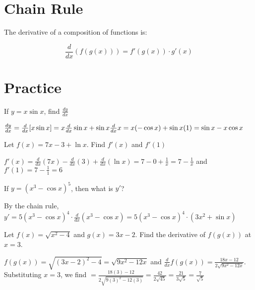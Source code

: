 \section{Chain Rule}

The derivative of a composition of functions is:

\begin{equation}
\frac{d}{dx}(f(g(x))) = f'(g(x)) \cdot g'(x)
\end{equation}

\section{Practice}
\begin{Exercise}[label=deriv_rules1]
    If $y=x\sin{x}$, find $\frac{dy}{dx}$
\end{Exercise}
\begin{Answer}[ref=deriv_rules1]
    $\frac{dy}{dx}=\frac{d}{dx}[x\sin{x}] = x\frac{d}{dx}\sin{x}+\sin{x}\frac{d}{dx}x = x(-\cos{x})+\sin{x}(1) \\
    = \sin{x}-x\cos{x}$
\end{Answer}

\begin{Exercise}[label=deriv_rules2]
    Let $f(x)=7x-3+\ln{x}$. Find $f'(x)$ and $f'(1)$
\end{Exercise}
\begin{Answer}[ref=deriv_rules2]
    $f'(x) = \frac{d}{dx}(7x) - \frac{d}{dx}(3)+\frac{d}{dx}(\ln{x})=7-0+\frac{1}{x}=7-\frac{1}{x}$
    and
    $f'(1) = 7-\frac{1}{1} = 6$
\end{Answer}

\begin{Exercise}[label=deriv_rules3]
    If $y=(x^3-\cos{x})^5$, then what is $y'$?
\end{Exercise}
\begin{Answer}[ref=deriv_rules3]
    By the chain rule, $y'=5(x^3-\cos{x})^4 \cdot \frac{d}{dx}(x^3-\cos{x}) = 5(x^3-\cos{x})^4 \cdot (3x^2+\sin{x})$
\end{Answer}

\begin{Exercise}
    [label=deriv_rules4]
    Let $f(x) = \sqrt{x^2-4}$ and $g(x) = 3x-2$. Find the derivative of $f(g(x))$ at $x=3$.
\end{Exercise}
\begin{Answer}
    [ref=deriv_rules4]
    $f(g(x)) = \sqrt{(3x-2)^2-4} = \sqrt{9x^2-12x}$ and $\frac{d}{dx}f(g(x))=\frac{18x-12}{2\sqrt{9x^2-12x}}$. Substituting $x=3$, we find $=\frac{18(3)-12}{2\sqrt{9(3)^2-12(3)}} = \frac{42}{2\sqrt{45}} = \frac{21}{3\sqrt{5}} = \frac{7}{\sqrt{5}}$
\end{Answer}

